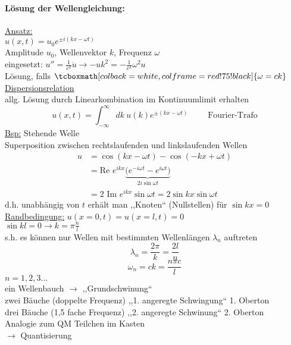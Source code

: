 \documentclass[titlepage,12pt,a4paper,ngerman]{report}
\newcommand{\tx}[1]{\textrm{#1}}
\newcommand{\ub}[1]{\underbrace{#1}}
\newcommand{\rmbox}[1]{\tcboxmath[colback=white,colframe=red!75!black]{#1}} %
\begin{document}
{\paragraph{Lösung der Wellengleichung:}
\underline{Ansatz:} \\
$ u(x,t) = u_0 e^{\pm i(kx-\omega t)} $\\
Amplitude $ u_0 $, Wellenvektor $ k $, Frequenz $ \omega $\\
eingesetzt: $ u'' = \frac{1}{c^2} \ddot{u} \rightarrow - u k^2 = - \frac{1}{c^2} \omega^2 u $\\
Lösung, falls $ \rmbox{\omega = ck} $ \underline{Dispersionsrelation}\\
allg. Lösung durch Linearkombination im Kontinuumlimit erhalten
$$ u(x,t) = \int_{-\infty}^{\infty} dk \ u(k) e^{\pm (kx - \omega t)} \qquad \tx{ Fourier-Trafo} $$
\underline{Bsp:} Stehende Welle\\
Superposition zwischen rechtslaufenden und linkslaufenden Wellen
\begin{align*}
u &= \cos (kx - \omega t) - \cos(-kx + \omega t) \\
& = \tx{Re } e^{ikx} \ub{ \bigg( e^{-i\omega t} - e^{i \omega t} \bigg) }_{2 i \sin \omega t}\\
& = 2 \tx{ Im } e^{ikx}\sin \omega t = 2 \sin kx \sin \omega t
\end{align*}
d.h. unabhängig von $ t $ erhält man ,,Knoten`` (Nullstellen) für $ \sin kx = 0 $\\
\underline{Randbedingung:} $ u(x=0,t) = u(x=l,t) = 0 $\\
$ \sin kl = 0 \rightarrow k = \pi \frac{n}{l} $\\
s.h. es können nur Wellen mit bestimmten Wellenlängen $ \lambda_n $ auftreten
$$ \lambda_n = \frac{2 \pi }{k} = \frac{2 l}{n}$$
$$ \omega_n = ck = \frac{n \pi c}{l} $$
$ n = 1,2,3\dots $\\
ein Wellenbauch $ \rightarrow $ ,,Grundschwinung``\\
zwei Bäuche (doppelte Frequenz)  ,,1. angeregte Schwingung`` 1. Oberton \\
drei Bäuche (1,5 fache Frequenz) ,,2. angeregte Schwinung`` 2. Oberton \\
Analogie zum QM Teilchen im Kasten\\
$ \rightarrow $ Quantisierung


}
\end{document}
